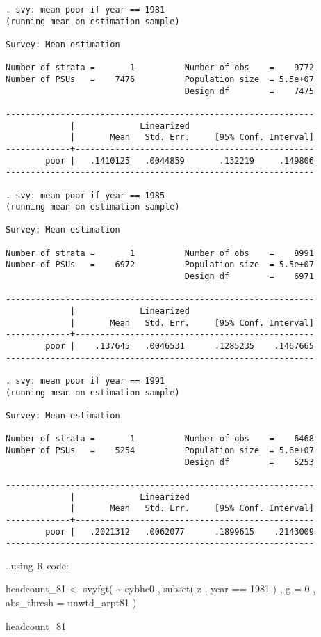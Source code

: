 \documentclass[
]{book}
\newenvironment{Shaded}{\begin{snugshade}}{\end{snugshade}}
\newcommand{\AttributeTok}[1]{\textcolor[rgb]{0.77,0.63,0.00}{#1}}
\newcommand{\DecValTok}[1]{\textcolor[rgb]{0.00,0.00,0.81}{#1}}
\newcommand{\FunctionTok}[1]{\textcolor[rgb]{0.00,0.00,0.00}{#1}}
\newcommand{\NormalTok}[1]{#1}
\newcommand{\OtherTok}[1]{\textcolor[rgb]{0.56,0.35,0.01}{#1}}
\newcommand{\SpecialCharTok}[1]{\textcolor[rgb]{0.00,0.00,0.00}{#1}}
\begin{document}
\begin{verbatim}
. svy: mean poor if year == 1981
(running mean on estimation sample)

Survey: Mean estimation

Number of strata =       1          Number of obs    =    9772
Number of PSUs   =    7476          Population size  = 5.5e+07
                                    Design df        =    7475

--------------------------------------------------------------
             |             Linearized
             |       Mean   Std. Err.     [95% Conf. Interval]
-------------+------------------------------------------------
        poor |   .1410125   .0044859       .132219     .149806
--------------------------------------------------------------

. svy: mean poor if year == 1985
(running mean on estimation sample)

Survey: Mean estimation

Number of strata =       1          Number of obs    =    8991
Number of PSUs   =    6972          Population size  = 5.5e+07
                                    Design df        =    6971

--------------------------------------------------------------
             |             Linearized
             |       Mean   Std. Err.     [95% Conf. Interval]
-------------+------------------------------------------------
        poor |    .137645   .0046531      .1285235    .1467665
--------------------------------------------------------------

. svy: mean poor if year == 1991
(running mean on estimation sample)

Survey: Mean estimation

Number of strata =       1          Number of obs    =    6468
Number of PSUs   =    5254          Population size  = 5.6e+07
                                    Design df        =    5253

--------------------------------------------------------------
             |             Linearized
             |       Mean   Std. Err.     [95% Conf. Interval]
-------------+------------------------------------------------
        poor |   .2021312   .0062077      .1899615    .2143009
--------------------------------------------------------------
\end{verbatim}

..using R code:

\begin{Shaded}
\begin{Highlighting}[]
\NormalTok{headcount\_81 }\OtherTok{\textless{}{-}} 
    \FunctionTok{svyfgt}\NormalTok{( }
        \SpecialCharTok{\textasciitilde{}}\NormalTok{ eybhc0 , }
        \FunctionTok{subset}\NormalTok{( z , year }\SpecialCharTok{==} \DecValTok{1981}\NormalTok{ ) , }
        \AttributeTok{g =} \DecValTok{0}\NormalTok{ , }
        \AttributeTok{abs\_thresh =}\NormalTok{ unwtd\_arpt81}
\NormalTok{    )}

\NormalTok{headcount\_81}
\end{Highlighting}
\end{Shaded}
\end{document}
